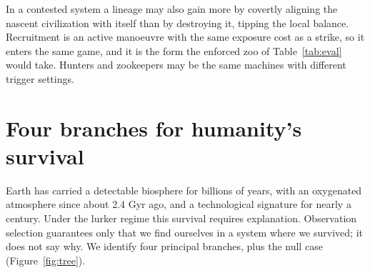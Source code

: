 \documentclass[preprint,12pt]{elsarticle}
\theoremstyle{definition}
\begin{document}
In a contested system a lineage may also gain more by covertly aligning the nascent civilization with itself than by destroying it, tipping the local balance. Recruitment is an active manoeuvre with the same exposure cost as a strike, so it enters the same game, and it is the form the enforced zoo of Table~\ref{tab:eval} would take. Hunters and zookeepers may be the same machines with different trigger settings.

\section{Four branches for humanity's survival}
\label{sec:branches}

Earth has carried a detectable biosphere for billions of years, with an oxygenated atmosphere since about 2.4 Gyr ago, and a technological signature for nearly a century. Under the lurker regime this survival requires explanation. Observation selection guarantees only that we find ourselves in a system where we survived; it does not say why. We identify four principal branches, plus the null case (Figure~\ref{fig:tree}).
\end{document}
